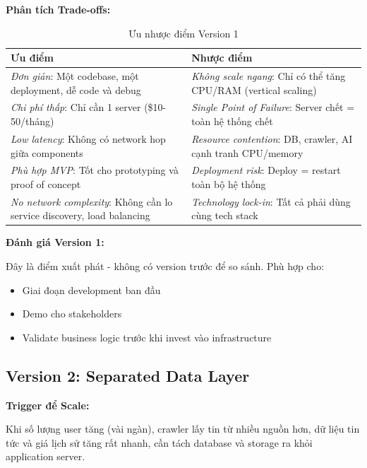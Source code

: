 \noindent\textbf{Phân tích Trade-offs:}

\begin{table}[H]
\centering
\caption{Ưu nhược điểm Version 1}
\begin{tabular}{|p{6.5cm}|p{6.5cm}|}
\hline
\textbf{Ưu điểm} & \textbf{Nhược điểm} \\
\hline
\textit{Đơn giản}: Một codebase, một deployment, dễ code và debug & \textit{Không scale ngang}: Chỉ có thể tăng CPU/RAM (vertical scaling) \\
\hline
\textit{Chi phí thấp}: Chỉ cần 1 server (\$10-50/tháng) & \textit{Single Point of Failure}: Server chết = toàn hệ thống chết \\
\hline
\textit{Low latency}: Không có network hop giữa components & \textit{Resource contention}: DB, crawler, AI cạnh tranh CPU/memory \\
\hline
\textit{Phù hợp MVP}: Tốt cho prototyping và proof of concept & \textit{Deployment risk}: Deploy = restart toàn bộ hệ thống \\
\hline
\textit{No network complexity}: Không cần lo service discovery, load balancing & \textit{Technology lock-in}: Tất cả phải dùng cùng tech stack \\
\hline
\end{tabular}
\end{table}

\noindent\textbf{Đánh giá Version 1:}

Đây là điểm xuất phát - không có version trước để so sánh. Phù hợp cho:
\begin{itemize}
    \item Giai đoạn development ban đầu
    \item Demo cho stakeholders
    \item Validate business logic trước khi invest vào infrastructure
\end{itemize}

\subsection{Version 2: Separated Data Layer}

\noindent\textbf{Trigger để Scale:}

Khi số lượng user tăng (vài ngàn), crawler lấy tin từ nhiều nguồn hơn, dữ liệu tin tức và giá lịch sử tăng rất nhanh, cần tách database và storage ra khỏi application server.

